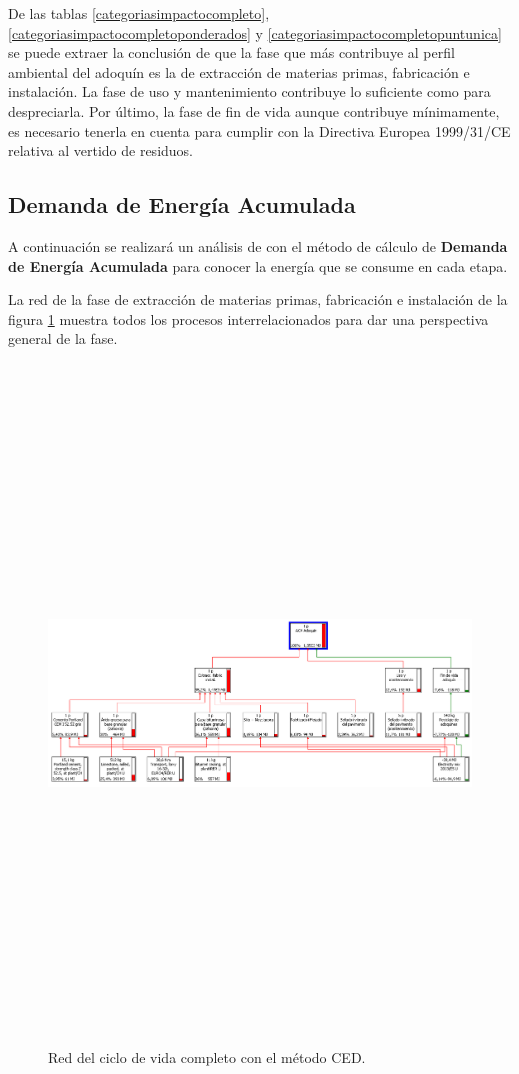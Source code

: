 De las tablas \ref{categoriasimpactocompleto}, \ref{categoriasimpactocompletoponderados} y \ref{categoriasimpactocompletopuntunica} se puede extraer la conclusión de que la fase que más contribuye al perfil ambiental del adoquín es la de extracción de materias primas, fabricación e instalación. La fase de uso y mantenimiento contribuye lo suficiente como para despreciarla. Por último, la fase de fin de vida aunque contribuye mínimamente, es necesario tenerla en cuenta para cumplir con la Directiva Europea 1999/31/CE relativa al vertido de residuos.

\subsection{Demanda de Energía Acumulada}
A continuación se realizará un análisis de con el método de cálculo de \textbf{Demanda de Energía Acumulada} para conocer la energía que se consume en cada etapa.

La red de la fase de extracción de materias primas, fabricación e instalación de la figura \ref{fig:ced_red} muestra todos los procesos interrelacionados para dar una perspectiva general de la fase.

\begin{figure}[!htbp]
\centering
\includegraphics[angle=90,height=18cm]{img/ced_red.png}
\caption{Red del ciclo de vida completo con el método CED.}
\label{fig:ced_red}
\end{figure}


